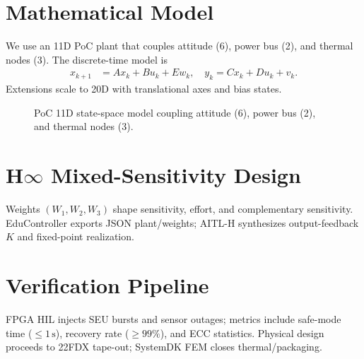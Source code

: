 \documentclass[conference]{IEEEtran}
\begin{document}
\section{Mathematical Model}
We use an 11D PoC plant that couples attitude (6), power bus (2), and thermal nodes (3). The discrete-time model is
\begin{align}
x_{k+1} &= A x_k + B u_k + E w_k, \quad
y_k = C x_k + D u_k + v_k.
\end{align}
Extensions scale to 20D with translational axes and bias states.

\begin{figure}[t]
  \centering
  \caption{PoC 11D state-space model coupling attitude (6), power bus (2), and thermal nodes (3).}
  \label{fig:state_space}
\end{figure}

\section{H$\infty$ Mixed-Sensitivity Design}
Weights $(W_1,W_2,W_3)$ shape sensitivity, effort, and complementary sensitivity. EduController exports JSON plant/weights; AITL-H synthesizes output-feedback $K$ and fixed-point realization.

\section{Verification Pipeline}
FPGA HIL injects SEU bursts and sensor outages; metrics include safe-mode time ($\leq 1\,\mathrm{s}$), recovery rate ($\geq 99\%$), and ECC statistics. Physical design proceeds to 22FDX tape-out; SystemDK FEM closes thermal/packaging.
\end{document}
